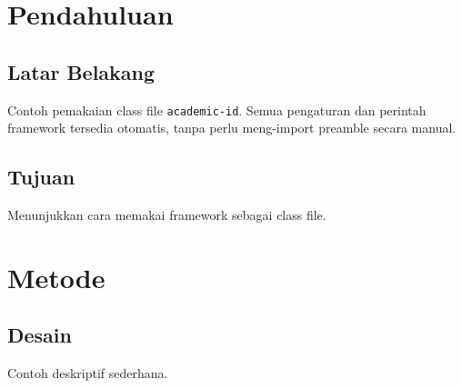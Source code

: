 \documentclass{academic-id}
\begin{document}



\chapter{Pendahuluan}
\section{Latar Belakang}
Contoh pemakaian class file \texttt{academic-id}. Semua pengaturan dan
perintah framework tersedia otomatis, tanpa perlu meng-import preamble
secara manual.\supercite{santosoKarakteristikGlaukomaTraumatik2020}
\section{Tujuan}
Menunjukkan cara memakai framework sebagai class file.

\chapter{Metode}
\section{Desain}
Contoh deskriptif sederhana.


\printbibliography[title={Daftar Pustaka}]
\end{document}
